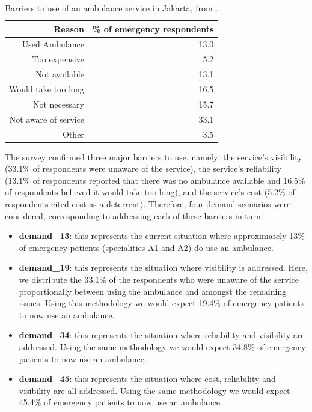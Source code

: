 \documentclass[preprint,12pt]{elsarticle}
\begin{document}
\begin{table}
\centering
\begin{tabular}{rr}
\toprule
Reason & \% of emergency respondents \\
\midrule
Used Ambulance & 13.0\\
Too expensive & 5.2  \\
Not available  & 13.1 \\
Would take too long & 16.5 \\
Not necessary & 15.7  \\
Not aware of service & 33.1\\
Other &3.5 \\
\bottomrule
\end{tabular}
\caption{Barriers to use of an ambulance service in Jakarta, from \cite{BriceSyaribahNoor2022Esui}.}
\label{table:survey_results}
\end{table}

The survey confirmed three major barriers to use, namely: the service's visibility (33.1\% of respondents were unaware of the service), the service's reliability (13.1\% of respondents reported that there was no ambulance available and 16.5\% of respondents believed it would take too long), and the service's cost (5.2\% of respondents cited cost as a deterrent). Therefore, four demand scenarios were considered, corresponding to addressing each of these barriers in turn:

\begin{itemize}
  \item \textbf{demand\_13}: this represents the current situation where approximately 13\% of emergency patients (specialities A1 and A2) do use an ambulance.
  \item \textbf{demand\_19}: this represents the situation where visibility is addressed. Here, we distribute the 33.1\% of the respondents who were unaware of the service proportionally between using the ambulance and amongst the remaining issues. Using this methodology we would expect 19.4\% of emergency patients to now use an ambulance.  
  \item \textbf{demand\_34}: this represents the situation where reliability and visibility are addressed. Using the same methodology we would expect 34.8\% of emergency patients to now use an ambulance.
  \item \textbf{demand\_45}: this represents the situation where cost, reliability and visibility are all addressed. Using the same methodology we would expect 45.4\% of emergency patients to now use an ambulance. 
\end{itemize}
\end{document}
